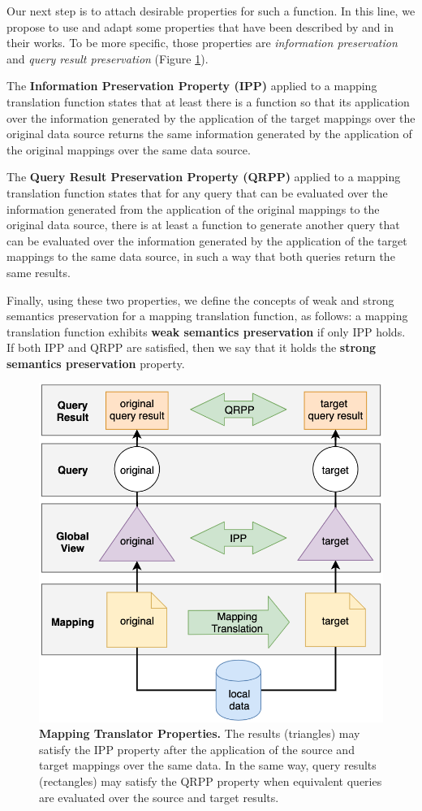 Our next step is to attach desirable properties for such a function. In this line, we propose to use and adapt some properties that have been described by \citep{sequeda2012directly} and \citep{hartig2017foundations} in their works. To be more specific, those properties are \textit{information preservation} and \textit{query result preservation} (Figure \ref{fig:mt}).

The \textbf{Information Preservation Property (IPP)} applied to a mapping translation function states that at least there is a function so that its application over the information generated by the application of the target mappings over the original data source returns the same information generated by the application of the original mappings over the same data source.

The \textbf{Query Result Preservation Property (QRPP)} applied to a mapping translation function states that for any query that can be evaluated over the information generated from the application of the original mappings to the original data source, there is at least a function to generate another query that can be evaluated over the information generated by the application of the target mappings to the same data source, in such a way that both queries return the same results.


Finally, using these two properties, we define the concepts of weak and strong semantics preservation for a mapping translation function, as follows: a mapping translation function exhibits \textbf{weak semantics preservation} if only IPP holds. If both IPP and QRPP are satisfied, then we say that it holds the \textbf{strong semantics preservation} property.


\begin{figure}[!ht]
    \centering
    \includegraphics[width=0.6\columnwidth]{./figures/mapping-translator.png}
    \caption[Mapping translator properties]{\textbf{Mapping Translator Properties.} The results (triangles) may satisfy the IPP property after the application of the source and target mappings over the same data. In the same way, query results (rectangles) may satisfy the QRPP property when equivalent queries are evaluated over the source and target results.}
    \label{fig:mt}
\end{figure}


